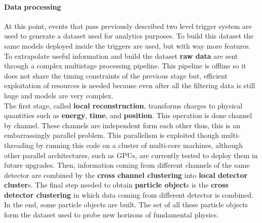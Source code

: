 \paragraph{Data processing} 
At this point, events that pass previously described two level trigger system are used to generate a dataset used for analytics purposes. To build this dataset the same models deployed inside the triggers are used, but with way more features. To extrapolate useful information and build the dataset \textbf{raw data} are sent through a complex multistage processing pipeline. This pipeline is offline so it does not share the timing constraints of the previous stage but, efficient exploitation of resources is needed because even after all the filtering data is still huge and models are very complex. \\
The first stage, called \textbf{local reconstruction}, transforms charges to physical quantities such as \textbf{energy}, \textbf{time}, and \textbf{position}. This operation is done channel by channel. These channels are independent form each other thus, this is an embarrassingly parallel problem. This parallelism is exploited though multi-threading by running this code on a cluster of multi-core machines, although other parallel architectures, such as GPUs, are currently tested to deploy them in future upgrades. Then, information coming from different channels of the same detector are combined by the \textbf{cross channel clustering} into \textbf{local detector cluster}s. The final step needed to obtain \textbf{particle object}s is the \textbf{cross detector clustering} in which data coming from different detector is combined. In the end, some particle objects are built. The set of all these particle objects form the dataset used to probe new horizons of fundamental physics.\\
